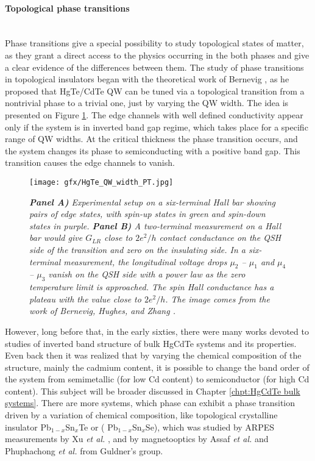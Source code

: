 \documentclass[titlepage,a4paper]{book}
\newcommand{\wciecie}{\quad\phantom{v}}
\newcommand{\myparagraph}[1]{\paragraph{#1}\mbox{}\\}
\begin{document}
\myparagraph{Topological phase transitions}
\wciecie
Phase transitions give a special possibility to study topological states of matter, as they grant a direct access to the physics occurring in the both phases and give a clear evidence of the differences between them. The study of phase transitions in topological insulators began with the theoretical work of Bernevig \cite{Bernevig_Topology2}, as he proposed that HgTe/CdTe QW can be tuned via a topological transition from a nontrivial phase to a trivial one, just by varying the QW width. The idea is presented on Figure \ref{fig:HgTe_QW_width_PT}. The edge channels with well defined conductivity appear only if the system is in inverted band gap regime, which takes place for a specific range of QW widths. At the critical thickness the phase transition occurs, and the system changes its phase to semiconducting with a positive band gap. This transition causes the edge channels to vanish.

\begin{figure}[ht]
	\centering
	\texttt{[image: gfx/HgTe\_QW\_width\_PT.jpg]}
	\vspace{-10pt}
	\caption{\textit{\textbf{Panel A)} Experimental setup on a six-terminal Hall bar showing pairs of edge states, with spin-up states in green and spin-down states in purple. \textbf{Panel B)} A two-terminal measurement on a Hall bar would give $G_{LR}$ close to $2e^2/h$ contact conductance on the QSH side of the transition and zero on the insulating side. In a six-terminal measurement, the longitudinal voltage drops $\mu_2$ -- $\mu_1$ and $\mu_4$ -- $\mu_3$ vanish on the QSH side with a power law as the zero temperature limit is approached. The spin Hall conductance has a plateau with the value close to $2e^2/h$. The image comes from the work of Bernevig, Hughes, and Zhang \cite{Bernevig_Topology2}.}}
	\label{fig:HgTe_QW_width_PT}
\end{figure} 

However, long before that, in the early sixties, there were many works devoted to studies of inverted band structure of bulk HgCdTe systems and its properties. Even back then it was realized that by varying the chemical composition of the structure, mainly the cadmium content, it is possible to change the band order of the system from semimetallic (for low Cd content) to semiconductor (for high Cd content). This subject will be broader discussed in Chapter \ref{chpt:HgCdTe bulk systems}. There are more systems, which phase can exhibit a phase transition driven by a variation of chemical composition, like topological crystalline insulator Pb$_{1-x}$Sn$_{x}$Te or ( Pb$_{1-x}$Sn$_{x}$Se), which was studied by ARPES measurements by Xu \textit{et al.} \cite{Xu_CTI}, and by magnetooptics by Assaf \textit{et al.} \cite{Assaf_MCT_layers1} and Phuphachong \textit{et al.} \cite{Assaf_MCT_layers2} from Guldner's group.  
\end{document}
